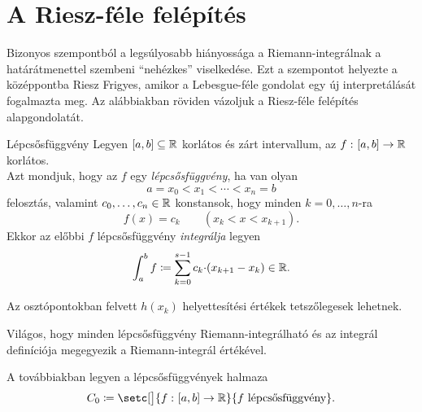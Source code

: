\documentclass[
]{elteikthesis}[2024/04/26]
\begin{document}
	\section{A Riesz-féle felépítés}
	
	\indent 
	Bizonyos szempontból a legsúlyosabb hiányossága a Riemann-integrálnak
	a határátmenettel szembeni ``nehézkes'' viselkedése. 
	Ezt a szempontot helyezte a középpontba Riesz Frigyes, 
	amikor a Lebesgue-féle gondolat egy új interpretálását fogalmazta meg. 
	Az alábbiakban röviden vázoljuk a Riesz-féle felépítés alapgondolatát.
	
	\newpage
	\begin{definition}{Lépcsősfüggvény}{}
		Legyen \( [a,b] \subseteq \mathbb{R} \) korlátos és zárt intervallum, az
		 \( f \,\colon [a, b] \to \mathbb{R} \) korlátos.\\[6pt]		
		Azt mondjuk, hogy az \( f \) egy \emph{lépcsősfüggvény}, ha van olyan
		\[
			a = x_0 < x_1 < \cdots < x_n = b
		\]
		felosztás, valamint \( c_0, \dots, c_n \in \mathbb{R} \) konstansok, 
		hogy minden \( k = 0,\dots,n \)-ra
		\[
			f(x) = c_k \qquad ( x_k < x < x_{k+1} ).
		\]
		Ekkor az előbbi \( f \) lépcsősfüggvény \emph{integrálja} legyen
		\[
			\int_a^b f \coloneq \sum_{k=0}^{s-1} c_k {\cdot} (x_{k + 1} - x_k) \in \mathbb{R}.
		\]
	\end{definition}
	
	\begin{notes}
		\item 
		Az osztópontokban felvett \( h(x_k) \) helyettesítési értékek tetszőlegesek lehetnek.
		
		\item
		Világos, hogy minden lépcsősfüggvény Riemann-integrálható és az integrál definíciója megegyezik a Riemann-integrál értékével.
	\end{notes}

	\noindent	
	A továbbiakban legyen a lépcsősfüggvények halmaza
	\[
		C_0 \coloneq
		\setc[\big]{ \func{f}{[a,b]}{\R} }{ f \text{ lépcsősfüggvény} }.
	\]
	
\end{document}
